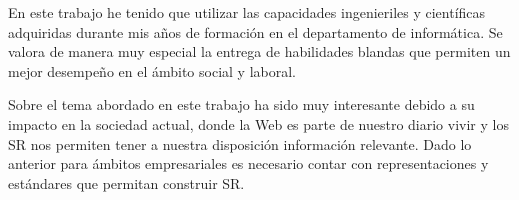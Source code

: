 En este trabajo he tenido que utilizar las capacidades ingenieriles y científicas adquiridas durante mis años de formación en el departamento de informática. Se valora de manera muy especial la entrega de habilidades blandas que permiten un mejor desempeño en el ámbito social y laboral.

Sobre el tema abordado en este trabajo ha sido muy interesante debido a su impacto en la sociedad actual, donde la Web es parte de nuestro diario vivir y los SR nos permiten tener a nuestra disposición información relevante. Dado lo anterior para ámbitos empresariales es necesario contar con representaciones y estándares que permitan construir SR.
